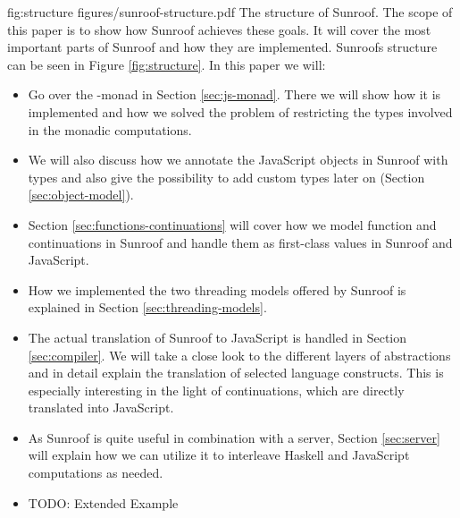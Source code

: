 \Figure%
{fig:structure}%
{figures/sunroof-structure.pdf}%
{The structure of Sunroof.}
The scope of this paper is to show how Sunroof achieves these goals.
It will cover the most important parts of Sunroof and how they are 
implemented. Sunroofs structure can be seen in Figure \ref{fig:structure}.
In this paper we will:
\begin{itemize}
\item 
Go over the \JS-monad in Section \ref{sec:js-monad}. There
we will show how it is implemented and how we solved
the problem of restricting the types involved in the monadic 
computations.
\item
We will also discuss how we annotate the JavaScript
objects in Sunroof with types and also give the possibility 
to add custom types later on (Section \ref{sec:object-model}).
\item
Section \ref{sec:functions-continuations} will cover how
we model function and continuations in Sunroof and handle
them as first-class values in Sunroof and JavaScript.
\item
How we implemented the two threading models offered by Sunroof is explained 
in Section \ref{sec:threading-models}.
\item
The actual translation of Sunroof to JavaScript is handled in 
Section \ref{sec:compiler}. We will take a close look to the
different layers of abstractions and in detail explain the 
translation of selected language constructs. This is 
especially interesting in the light of continuations, which
are directly translated into JavaScript.
\item
As Sunroof is quite useful in combination with a server,
Section \ref{sec:server} will explain how we can utilize it 
to interleave Haskell and JavaScript computations as needed.
\item
TODO: Extended Example
\end{itemize}



